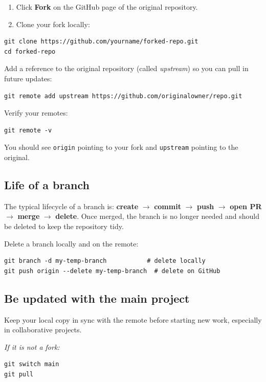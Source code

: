 \documentclass[12pt]{article}
\begin{document}
\begin{enumerate}
  \item Click \textbf{Fork} on the GitHub page of the original repository.
  \item Clone your fork locally:
\end{enumerate}

\begin{verbatim}
git clone https://github.com/yourname/forked-repo.git
cd forked-repo
\end{verbatim}

Add a reference to the original repository (called \emph{upstream}) so you can pull in future updates:

\begin{verbatim}
git remote add upstream https://github.com/originalowner/repo.git
\end{verbatim}

Verify your remotes:

\begin{verbatim}
git remote -v
\end{verbatim}

You should see \texttt{origin} pointing to your fork and \texttt{upstream} pointing to the original.

\subsection{Life of a branch}

The typical lifecycle of a branch is: \textbf{create} $\to$ \textbf{commit} $\to$ \textbf{push} $\to$ \textbf{open PR} $\to$ \textbf{merge} $\to$ \textbf{delete}. Once merged, the branch is no longer needed and should be deleted to keep the repository tidy.

Delete a branch locally and on the remote:

\begin{verbatim}
git branch -d my-temp-branch           # delete locally
git push origin --delete my-temp-branch  # delete on GitHub
\end{verbatim}

\subsection{Be updated with the main project}

Keep your local copy in sync with the remote before starting new work, especially in collaborative projects.

\emph{If it is not a fork:}
\begin{verbatim}
git switch main
git pull
\end{verbatim}
\end{document}

